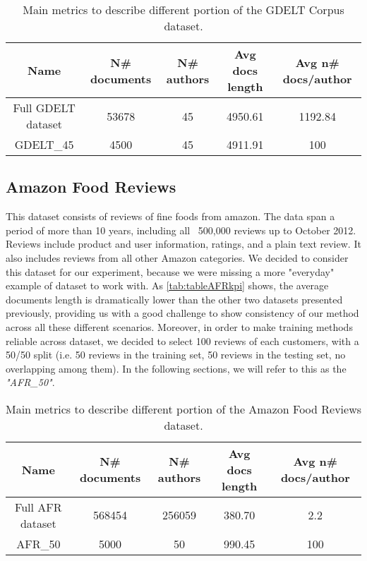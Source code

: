\begin{table}[h!]
	\begin{center}  
		\caption[GDELT Corpus metrics]{Main metrics to describe different portion of the GDELT Corpus dataset.} 
		\label{tab:tableGDELTkpi}
		\begin{tabular}{|c | c | c | c | c |}
			\hline 
			Name & N\# documents & N\# authors & Avg docs length & Avg n\# docs/author \\
			\hline
			Full GDELT dataset & 53678 & 45 & 4950.61 & 1192.84 \\ \hline
			GDELT\_45 & 4500 & 45 & 4911.91 & 100  \\ \hline
		\end{tabular} 
	\end{center}
\end{table}

\subsection{Amazon Food Reviews}
This dataset consists of reviews of fine foods from amazon. The data span a period of more than 10 years, including all ~500,000 reviews up to October 2012. Reviews include product and user information, ratings, and a plain text review. It also includes reviews from all other Amazon categories.
We decided to consider this dataset for our experiment, because we were missing a more "everyday" example of dataset to work with. As \autoref{tab:tableAFRkpi} shows, the average documents length is dramatically lower than the other two datasets presented previously, providing us with a good challenge to show consistency of our method across all these different scenarios.
Moreover, in order to make training methods reliable across dataset, we decided to select 100 reviews of each customers, with a 50/50 split (i.e. 50 reviews in the training set, 50 reviews in the testing set, no overlapping among them). In the following sections, we will refer to this as the \textit{"AFR\_50"}.

\begin{table}[h!]
	\begin{center}  
		\caption[Amazon Food Reviews Corpus metrics]{Main metrics to describe different portion of the Amazon Food Reviews dataset.} 
		\label{tab:tableAFRkpi}
		\begin{tabular}{|c | c | c | c | c |}
			\hline 
			Name & N\# documents & N\# authors & Avg docs length & Avg n\# docs/author \\
			\hline
			Full AFR dataset & 568454 & 256059 & 380.70 & 2.2 \\ \hline
			AFR\_50 & 5000 & 50 & 990.45 & 100  \\ \hline
		\end{tabular} 
	\end{center}
\end{table}

